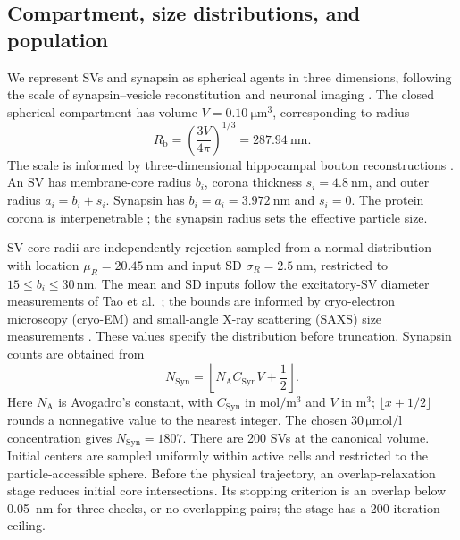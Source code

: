 \documentclass[11pt,letterpaper]{article}
\newcommand{\Syn}{\mathrm{Syn}}
\begin{document}
\subsection{Compartment, size distributions, and population}
We represent SVs and synapsin as spherical agents in three dimensions,
following the scale of synapsin--vesicle reconstitution and neuronal
imaging \cite{Milovanovic2018,Hoffmann2023}. The closed spherical
compartment has volume
\(V=\SI{0.10}{\micro\metre\cubed}\), corresponding to radius
\begin{equation}
 R_{\mathrm b}=\left(\frac{3V}{4\pi}\right)^{1/3}
 =\SI{287.94}{\nano\metre}.
 \label{eq:box-radius}
\end{equation}
The scale is informed by three-dimensional hippocampal bouton reconstructions
\cite{Schikorski1997}. An SV has membrane-core radius \(b_i\), corona thickness
\(s_i=\SI{4.8}{\nano\metre}\), and outer radius \(a_i=b_i+s_i\).
Synapsin has \(b_i=a_i=\SI{3.972}{\nano\metre}\) and \(s_i=0\).
The protein corona is interpenetrable \cite{Neuhaus2024}; the synapsin
radius sets the effective particle size.

SV core radii are independently rejection-sampled from a normal distribution
with location \(\mu_R=\SI{20.45}{\nano\metre}\) and input SD
\(\sigma_R=\SI{2.5}{\nano\metre}\), restricted to
\(15\leq b_i\leq30\,\si{\nano\metre}\). The mean and SD inputs follow the
excitatory-SV diameter measurements of Tao et al.\ \cite{Tao2018}; the bounds
are informed by cryo-electron microscopy (cryo-EM) and small-angle
X-ray scattering (SAXS) size measurements \cite{Castorph2010}. These
values specify the distribution before truncation. Synapsin counts
are obtained from
\begin{equation}
 N_{\Syn}=\left\lfloor N_{\mathrm A}C_{\Syn}V+\frac12\right\rfloor.
 \label{eq:count}
\end{equation}
Here \(N_{\mathrm A}\) is Avogadro's constant, with \(C_{\Syn}\) in
\(\si{\mole\per\metre\cubed}\) and \(V\) in \(\si{\metre\cubed}\);
\(\lfloor x+1/2\rfloor\) rounds a nonnegative value to the nearest integer.
The chosen \(30\,\si{\micro\mole\per\litre}\) concentration gives
\(N_{\Syn}=1807\).
There are 200 SVs at the canonical volume. Initial centers are sampled
uniformly within active cells and restricted to the particle-accessible
sphere. Before the physical trajectory, an overlap-relaxation stage
reduces initial core intersections. Its stopping criterion is an overlap
below \SI{0.05}{\nano\metre} for three checks, or no overlapping pairs;
the stage has a 200-iteration ceiling.
\end{document}
